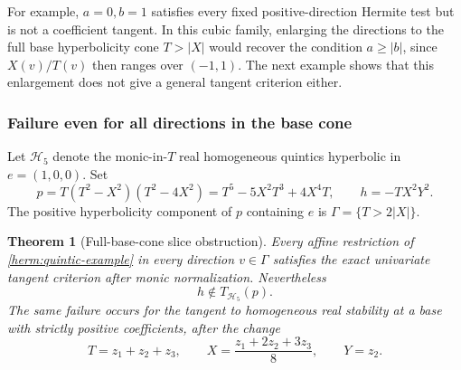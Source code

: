 \documentclass[reqno]{amsart}
\newtheorem{theorem}{Theorem}[section]
\theoremstyle{definition}
\theoremstyle{remark}
\begin{document}
For example, $a=0,b=1$ satisfies every fixed positive-direction Hermite
test but is not a coefficient tangent.  In this cubic family, enlarging
the directions to the full base hyperbolicity cone $T>|X|$ would recover
the condition $a\geq|b|$, since $X(v)/T(v)$ then ranges over $(-1,1)$.
The next example shows that this enlargement does not give a general
tangent criterion either.

\subsubsection{Failure even for all directions in the base cone}

Let $\mathcal H_5$ denote the monic-in-$T$ real homogeneous quintics
hyperbolic in $e=(1,0,0)$.  Set
\begin{equation}
 p=T(T^2-X^2)(T^2-4X^2)
       =T^5-5X^2T^3+4X^4T,
 \qquad h=-TX^2Y^2.
 \label{herm:quintic-example}
\end{equation}
The positive hyperbolicity component of $p$ containing $e$ is
$\Gamma=\{T>2|X|\}$.

\begin{theorem}[Full-base-cone slice obstruction]
\label{herm:quintic-slices}
Every affine restriction of \eqref{herm:quintic-example} in every
direction $v\in\Gamma$ satisfies the exact univariate tangent criterion
after monic normalization.  Nevertheless
\[
 h\notin T_{\mathcal H_5}(p).
\]
The same failure occurs for the tangent to homogeneous real stability
at a base with strictly positive coefficients, after the change
\begin{equation}
 T=z_1+z_2+z_3,\qquad
 X=\frac{z_1+2z_2+3z_3}{8},\qquad Y=z_2.
 \label{herm:quintic-coordinates}
\end{equation}
\end{theorem}
\end{document}
